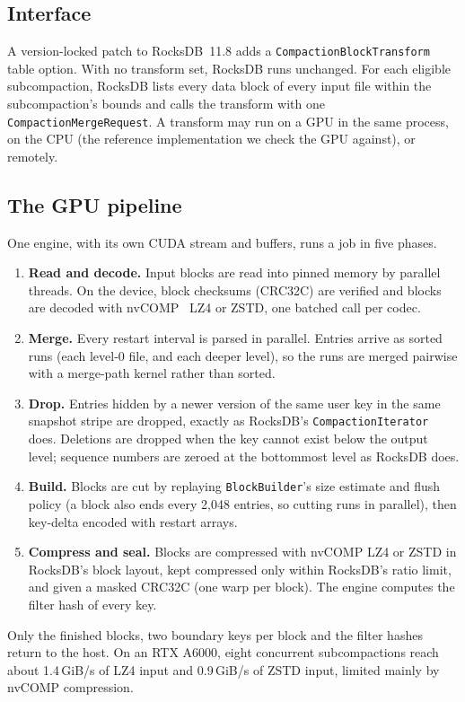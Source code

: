 \documentclass[sigconf, nonacm]{acmart}
\begin{document}
\subsection{Interface}
A version-locked patch to RocksDB~11.8 adds a \texttt{CompactionBlockTransform} table option.
With no transform set, RocksDB runs unchanged. For each eligible subcompaction, RocksDB lists
every data block of every input file within the subcompaction's bounds and calls the
transform with one \texttt{CompactionMergeRequest}. A transform may run on a GPU in the same
process, on the CPU (the reference implementation we check the GPU against), or remotely.

\subsection{The GPU pipeline}
One engine, with its own CUDA stream and buffers, runs a job in five phases.
\begin{enumerate}
  \item \textbf{Read and decode.} Input blocks are read into pinned memory by parallel
        threads. On the device, block checksums (CRC32C) are verified and blocks are decoded
        with nvCOMP~\cite{nvcomp} LZ4 or ZSTD, one batched call per codec.
  \item \textbf{Merge.} Every restart interval is parsed in parallel. Entries arrive as
        sorted runs (each level-0 file, and each deeper level), so the runs are merged
        pairwise with a merge-path kernel rather than sorted.
  \item \textbf{Drop.} Entries hidden by a newer version of the same user key in the same
        snapshot stripe are dropped, exactly as RocksDB's \texttt{CompactionIterator} does.
        Deletions are dropped when the key cannot exist below the output level; sequence
        numbers are zeroed at the bottommost level as RocksDB does.
  \item \textbf{Build.} Blocks are cut by replaying \texttt{BlockBuilder}'s size estimate and
        flush policy (a block also ends every 2{,}048 entries, so cutting runs in parallel),
        then key-delta encoded with restart arrays.
  \item \textbf{Compress and seal.} Blocks are compressed with nvCOMP LZ4 or ZSTD in RocksDB's
        block layout, kept compressed only within RocksDB's ratio limit, and given a masked
        CRC32C (one warp per block). The engine computes the filter hash of every key.
\end{enumerate}
Only the finished blocks, two boundary keys per block and the filter hashes return to the
host. On an RTX A6000, eight concurrent subcompactions reach about 1.4\,GiB/s of LZ4 input and
0.9\,GiB/s of ZSTD input, limited mainly by nvCOMP compression.
\end{document}
